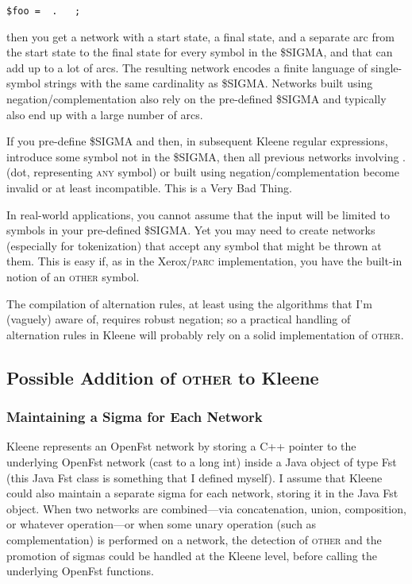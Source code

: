 \documentclass[letterpaper,11pt]{article}
\providecommand{\acro}{}\renewcommand{\acro}{\textsc}
\begin{document}
\begin{Verbatim}[fontsize=\footnotesize]
$foo =  .   ;
\end{Verbatim}

\noindent
then you get a network with a start state, a final state, and a
separate arc from the start state to the final state 
for every symbol in the \$SIGMA, and that can add up to a lot of arcs.  
	The resulting network encodes a
	finite language of single-symbol strings with the same
	cardinality as \$SIGMA.  Networks built using
negation/complementation also rely on the pre-defined \$SIGMA and 
typically also end up with a large number of arcs.  

 If you pre-define \$SIGMA and then, in subsequent Kleene regular
 expressions, 
 introduce some symbol not in the \$SIGMA, then all previous networks
 involving .  (dot, representing \acro{any} symbol) or built using
 negation/complementation become invalid or at least incompatible.
 This is a Very Bad Thing.
 
In real-world applications, you cannot assume that the input will be
limited to symbols in your pre-defined \$SIGMA.
Yet you may need to create networks (especially for tokenization) that accept any symbol that might be
thrown at them.  This is easy if, as in the Xerox/\acro{parc}
implementation, you have the built-in notion of an \acro{other}
symbol.

The compilation of alternation rules, at least using the algorithms
that I'm (vaguely) aware of, requires robust negation; so a practical
handling of alternation rules in Kleene will probably rely on a
solid implementation of \acro{other}.


\subsection{Possible Addition of \acro{other} to Kleene}

\subsubsection{Maintaining a Sigma for Each Network}

Kleene represents an OpenFst network by storing a C++ pointer to the underlying
OpenFst network (cast to a
long int) inside a Java object of type Fst (this Java Fst class is something that
I defined myself).  I
assume that Kleene could also maintain a separate sigma for each
network, storing it in the Java Fst object.
When two networks are combined---via concatenation, union,
composition, or whatever operation---or when some unary operation
(such as complementation) is performed on a network, the detection of \acro{other} and
the promotion of sigmas
could be handled at the Kleene level, before calling the
underlying OpenFst functions.
\end{document}
